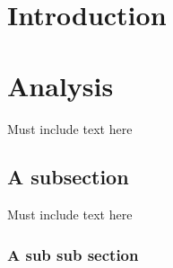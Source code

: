 \documentclass[12pt]{article}
\begin{document}





\formattingForRestOfReport
\section{Introduction}





\newpage
\section{Analysis} 


Must include text here
\subsection{A subsection}
Must include text here
\subsubsection{A sub sub section}
\end{document}
